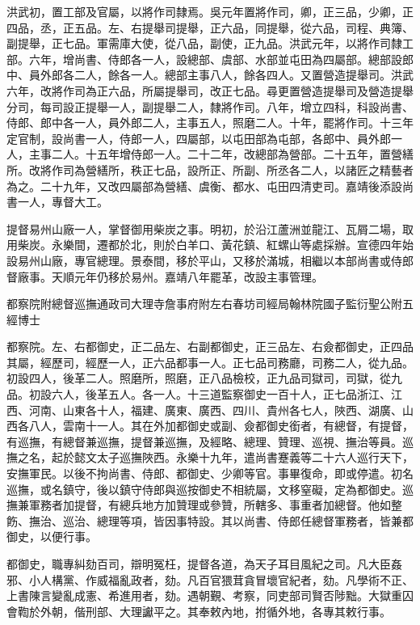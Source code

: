 洪武初，置工部及官屬，以將作司隸焉。吳元年置將作司，卿，正三品，少卿，正四品，丞，正五品。左、右提舉司提舉，正六品，同提舉，從六品，司程、典簿、副提舉，正七品。軍需庫大使，從八品，副使，正九品。洪武元年，以將作司隸工部。六年，增尚書、侍郎各一人，設總部、虞部、水部並屯田為四屬部。總部設郎中、員外郎各二人，餘各一人。總部主事八人，餘各四人。又置營造提舉司。洪武六年，改將作司為正六品，所屬提舉司，改正七品。尋更置營造提舉司及營造提舉分司，每司設正提舉一人，副提舉二人，隸將作司。八年，增立四科，科設尚書、侍郎、郎中各一人，員外郎二人，主事五人，照磨二人。十年，罷將作司。十三年定官制，設尚書一人，侍郎一人，四屬部，以屯田部為屯部，各郎中、員外郎一人，主事二人。十五年增侍郎一人。二十二年，改總部為營部。二十五年，置營繕所。改將作司為營繕所，秩正七品，設所正、所副、所丞各二人，以諸匠之精藝者為之。二十九年，又改四屬部為營繕、虞衡、都水、屯田四清吏司。嘉靖後添設尚書一人，專督大工。

提督易州山廠一人，掌督御用柴炭之事。明初，於沿江蘆洲並龍江、瓦屑二場，取用柴炭。永樂間，遷都於北，則於白羊口、黃花鎮、紅螺山等處採辦。宣德四年始設易州山廠，專官總理。景泰間，移於平山，又移於滿城，相繼以本部尚書或侍郎督廠事。天順元年仍移於易州。嘉靖八年罷革，改設主事管理。


都察院附總督巡撫通政司大理寺詹事府附左右春坊司經局翰林院國子監衍聖公附五經博士

都察院。左、右都御史，正二品左、右副都御史，正三品左、右僉都御史，正四品其屬，經歷司，經歷一人，正六品都事一人。正七品司務廳，司務二人，從九品。初設四人，後革二人。照磨所，照磨，正八品檢校，正九品司獄司，司獄，從九品。初設六人，後革五人。各一人。十三道監察御史一百十人，正七品浙江、江西、河南、山東各十人，福建、廣東、廣西、四川、貴州各七人，陜西、湖廣、山西各八人，雲南十一人。其在外加都御史或副、僉都御史銜者，有總督，有提督，有巡撫，有總督兼巡撫，提督兼巡撫，及經略、總理、贊理、巡視、撫治等員。巡撫之名，起於懿文太子巡撫陜西。永樂十九年，遣尚書蹇義等二十六人巡行天下，安撫軍民。以後不拘尚書、侍郎、都御史、少卿等官。事畢復命，即或停遣。初名巡撫，或名鎮守，後以鎮守侍郎與巡按御史不相統屬，文移窒礙，定為都御史。巡撫兼軍務者加提督，有總兵地方加贊理或參贊，所轄多、事重者加總督。他如整飭、撫治、巡治、總理等項，皆因事特設。其以尚書、侍郎任總督軍務者，皆兼都御史，以便行事。

都御史，職專糾劾百司，辯明冤枉，提督各道，為天子耳目風紀之司。凡大臣姦邪、小人構黨、作威福亂政者，劾。凡百官猥茸貪冒壞官紀者，劾。凡學術不正、上書陳言變亂成憲、希進用者，劾。遇朝覲、考察，同吏部司賢否陟黜。大獄重囚會鞫於外朝，偕刑部、大理讞平之。其奉敕內地，拊循外地，各專其敕行事。

